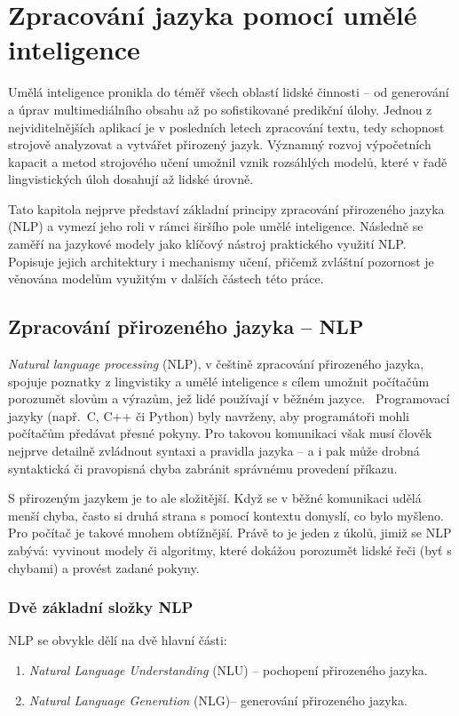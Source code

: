 \chapter{Zpracování jazyka pomocí umělé inteligence}\label{kapitola1}

Umělá inteligence pronikla do téměř všech oblastí lidské činnosti -- od generování a úprav multimediálního obsahu až po sofistikované predikční úlohy. Jednou z nejviditelnějších aplikací je v posledních letech zpracování textu, tedy schopnost strojově analyzovat a vytvářet přirozený jazyk. Významný rozvoj výpočetních kapacit a metod strojového učení umožnil vznik rozsáhlých modelů, které v řadě lingvistických úloh dosahují až lidské úrovně.

Tato kapitola nejprve představí základní principy zpracování přirozeného jazyka (NLP) a vymezí jeho roli v rámci širšího pole umělé inteligence. Následně se zaměří na jazykové modely jako klíčový nástroj praktického využití NLP. Popisuje jejich architektury i mechanismy učení, přičemž zvláštní pozornost je věnována modelům využitým v dalších částech této práce.

\section{Zpracování přirozeného jazyka -- NLP}\label{NLP}

\emph{Natural language processing} (NLP), v češtině zpracování přirozeného jazyka, spojuje poznatky z lingvistiky a umělé inteligence s cílem umožnit počítačům porozumět slovům a výrazům, jež lidé používají v běžném jazyce.~\cite{Khurana2023} Programovací jazyky (např.~C, C++ či Python) byly navrženy, aby programátoři mohli počítačům předávat přesné pokyny. Pro takovou komunikaci však musí člověk nejprve detailně zvládnout syntaxi a pravidla jazyka -- a i pak může drobná syntaktická či pravopisná chyba zabránit správnému provedení příkazu.

S přirozeným jazykem je to ale složitější. Když se v běžné komunikaci udělá menší chyba, často si druhá strana s pomocí kontextu domyslí, co bylo myšleno. Pro počítač je takové  mnohem obtížnější. Právě to je jeden z úkolů, jimiž se NLP zabývá: vyvinout modely či algoritmy, které dokážou porozumět lidské řeči (byť s chybami) a provést zadané pokyny.

\subsection{Dvě základní složky NLP}
NLP se obvykle dělí na dvě hlavní části:
\begin{enumerate}
  \item \emph{Natural Language Understanding} (NLU) -- pochopení přirozeného jazyka.
  \item \emph{Natural Language Generation} (NLG)-- generování přirozeného jazyka.
\end{enumerate}

